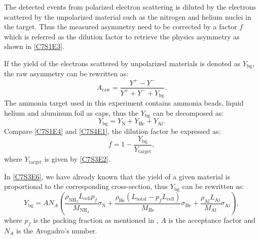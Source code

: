 The detected events from polarized electron scattering is diluted by the electrons scattered by the unpolarized material such as the nitrogen and helium nuclei in the target. Thus the measured asymmetry need to be corrected by a factor $f$ which is referred as the dilution factor to retrieve the physics asymmetry as shown in \cref{C7S1E3}.

If the yield of the electrons scattered by unpolarized materials is denoted as $Y_{\mathrm{bg}}$, the raw asymmetry can be rewritten as:
\begin{equation} \label{C7S4E1}
A_{\mathrm{raw}} = \frac{Y^+-Y^-}{Y^++Y^-+Y_{\mathrm{bg}}}.
\end{equation}
The ammonia target used in this experiment contains ammonia beads, liquid helium and aluminum foil as caps, thus the $Y_{\mathrm{bg}}$ can be decomposed as:
\begin{equation} \label{C7S4E2}
Y_{\mathrm{bg}} = Y_{\mathrm{N}}+Y_{\mathrm{He}}+Y_{\mathrm{Al}}.
\end{equation}
Compare \cref{C7S1E4} and \cref{C7S4E1}, the dilution factor be expressed as:
\begin{equation} \label{C7S4E3}
f = 1-\frac{Y_{\mathrm{bg}}}{Y_{\mathrm{target}}},
\end{equation}
where $Y_{\mathrm{target}}$ is given by \cref{C7S3E2}.

In \cref{C7S3E6}, we have already known that the yield of a given material is proportional to the corresponding cross-section, thus $Y_{\mathrm{bg}}$ can be rewritten as:
\begin{equation} \label{C7S4E4}
Y_{\mathrm{bg}} = AN_A\left(\frac{\rho_{\mathrm{NH_3}}L_{\mathrm{cell}}p_f}{M_{\mathrm{NH_3}}}\sigma_{\mathrm{N}}+\frac{\rho_{\mathrm{He}}(L_{\mathrm{total}}-p_fL_{\mathrm{cell}})}{M_{\mathrm{He}}}\sigma_{\mathrm{He}}+\frac{\rho_{\mathrm{Al}}L_{\mathrm{Al}}}{M_{\mathrm{Al}}}\sigma_{\mathrm{Al}}\right),
\end{equation}
where $p_f$ is the packing fraction as mentioned in , $A$ is the acceptance factor and $N_A$ is the Avogadro's number.


